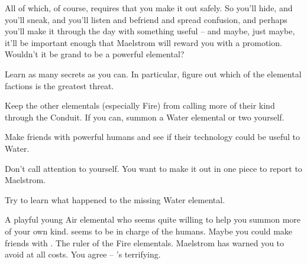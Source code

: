 \documentclass[char]{elementals}
\begin{document}
All of which, of course, requires that you make it out safely. So you'll hide, and you'll sneak, and you'll listen and befriend and spread confusion, and perhaps you'll make it through the day with something useful -- and maybe, just maybe, it'll be important enough that Maelstrom will reward you with a promotion. Wouldn't it be grand to be a powerful elemental?

\begin{itemz}[Goals]
	\item  Learn as many secrets as you can. In particular, figure out which of the elemental factions is the greatest threat.
	\item  Keep the other elementals (especially Fire) from calling more of their kind through the Conduit. If you can, summon a Water elemental or two yourself.
	\item  Make friends with powerful humans and see if their technology could be useful to Water.
	\item  Don't call attention to yourself. You want to make it out in one piece to report to Maelstrom.
	\item  Try to learn what happened to the missing Water elemental.
\end{itemz}

\begin{contacts}
	\contact{\cMiniAir{\intro}} A playful young Air elemental who seems quite willing to help you summon more of your own kind.
	\contact{\cLeader{\intro}} \cLeader{\They} seems to be in charge of the humans. Maybe you could make friends with \cLeader{\them}.
  \contact{\cQueen{\intro}} The ruler of the Fire elementals. Maelstrom has warned you to avoid \cQueen{\them} at all costs. You agree -- \cQueen{\they}'s terrifying.
\end{contacts} 
\end{document}
